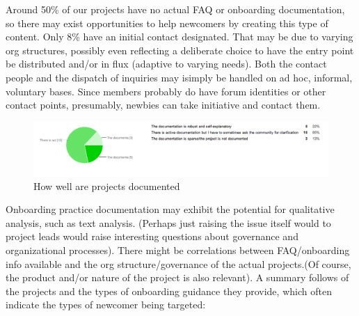 Around 50\% of our projects have no actual FAQ or onboarding documentation, so there may exist opportunities to help newcomers by creating this type of content. Only 8\% have an initial contact designated. That may be due to varying org structures, possibly even reflecting a deliberate choice to have the entry point be distributed and/or in flux (adaptive to varying needs). Both the contact people and the dispatch of inquiries may isimply be handled on ad hoc, informal, voluntary bases. Since members probably do have forum identities or other contact points, presumably, newbies can take initiative and contact them.

\begin{figure}[ht!]
\centering
\includegraphics[width=120mm]{chapters/img/documentation.png}
\caption{How well are projects documented }
\label{overflow}
\end{figure}

Onboarding practice documentation may exhibit the potential for qualitative analysis, such as text analysis. (Perhaps just raising the issue itself would to project leads would raise interesting questions about governance and organizational processes). There might be correlations between FAQ/onboarding info available and the org structure/governance of the actual projects.(Of course, the product and/or nature of the project is also relevant). A summary follows of the projects and the types of onboarding guidance they provide, which often indicate the types of newcomer being targeted:

